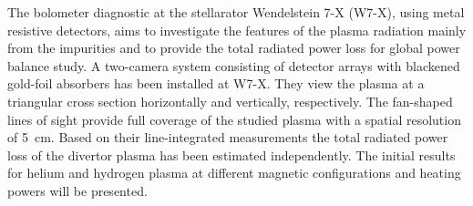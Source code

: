 \documentclass{scdpg}
\begin{document}
%
\begin{scAbstract}
%
%
%
%
\scBeginText
%
The bolometer diagnostic at the stellarator Wendelstein 7-X (W7-X), using metal resistive detectors, aims to investigate the features of the plasma radiation mainly from the impurities and to provide the total radiated power loss for global power balance study.  A two-camera system consisting of detector arrays with blackened gold-foil absorbers has been installed at W7-X. They view the plasma at a triangular cross section horizontally and vertically, respectively. The fan-shaped lines of sight provide full coverage of the studied plasma with a spatial resolution of \SI{5}{\centi\meter}. Based on their line-integrated measurements the total radiated power loss of the divertor plasma has been estimated independently. The initial results for helium and hydrogen plasma at different magnetic configurations and heating powers will be presented.
%
%
\scEndText
{}
%
\end{scAbstract}
%
\end{document}
